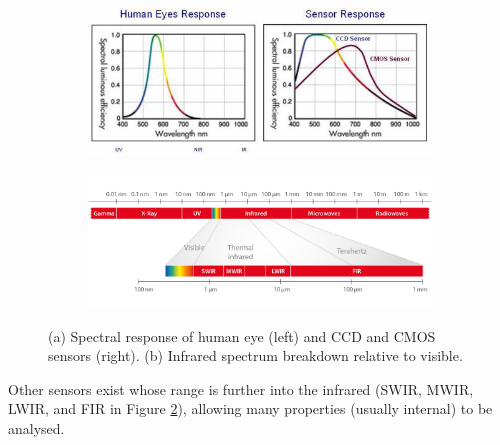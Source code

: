 \documentclass[fleqn,twoside,12pt]{report}
\begin{document}
\begin{figure}[h]
	\centering
	\begin{subfigure}{.9\textwidth}
		\centering
		\includegraphics[width=0.9\linewidth]{spectralresponse.jpg}
		\caption{}
		\label{fig:eye_sensor}
	\end{subfigure}
	
	\begin{subfigure}{.9\textwidth}
		\centering
		\includegraphics[width=.9\linewidth]{infra-red.jpg}
		\caption{}
		\label{fig:ifra-red}
	\end{subfigure}%
	\caption{(a) Spectral response of human eye (left) and CCD and CMOS sensors (right). (b) Infrared spectrum breakdown relative to visible.}
	\label{fig:spectrum}
\end{figure}%

Other sensors exist whose range is further into the infrared (SWIR, MWIR, LWIR, and FIR in Figure \ref{fig:ifra-red}), allowing many properties (usually internal) to be analysed.
\end{document}
